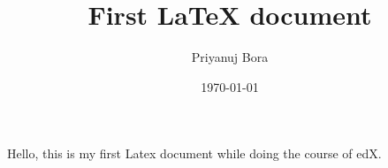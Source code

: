 \documentclass{article}
\title{First LaTeX document}
\author{Priyanuj Bora}
\date{\today}
\begin{document}
	\maketitle %
	Hello, this is my first Latex document while doing the course of edX.
\end{document}
